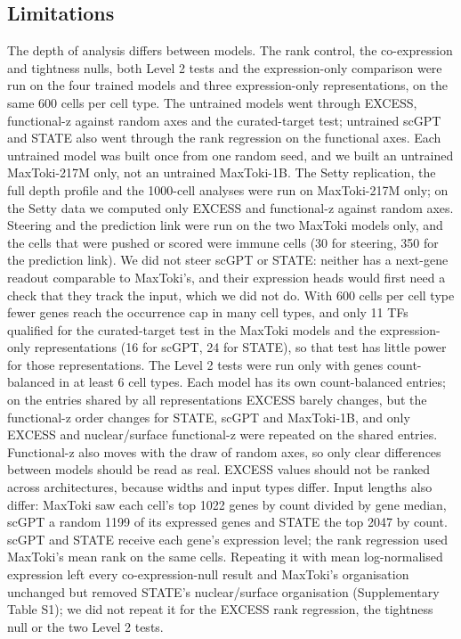 \documentclass[
  11pt,
]{article}
\begin{document}
\subsection{Limitations}\label{limitations}

The depth of analysis differs between models. The rank control, the
co-expression and tightness nulls, both Level 2 tests and the
expression-only comparison were run on the four trained models and three
expression-only representations, on the same 600 cells per cell type.
The untrained models went through EXCESS, functional-z against random
axes and the curated-target test; untrained scGPT and STATE also went
through the rank regression on the functional axes. Each untrained model
was built once from one random seed, and we built an untrained
MaxToki-217M only, not an untrained MaxToki-1B. The Setty replication,
the full depth profile and the 1000-cell analyses were run on
MaxToki-217M only; on the Setty data we computed only EXCESS and
functional-z against random axes. Steering and the prediction link were
run on the two MaxToki models only, and the cells that were pushed or
scored were immune cells (30 for steering, 350 for the prediction link).
We did not steer scGPT or STATE: neither has a next-gene readout
comparable to MaxToki's, and their expression heads would first need a
check that they track the input, which we did not do. With 600 cells per
cell type fewer genes reach the occurrence cap in many cell types, and
only 11 TFs qualified for the curated-target test in the MaxToki models
and the expression-only representations (16 for scGPT, 24 for STATE), so
that test has little power for those representations. The Level 2 tests
were run only with genes count-balanced in at least 6 cell types. Each
model has its own count-balanced entries; on the entries shared by all
representations EXCESS barely changes, but the functional-z order
changes for STATE, scGPT and MaxToki-1B, and only EXCESS and
nuclear/surface functional-z were repeated on the shared entries.
Functional-z also moves with the draw of random axes, so only clear
differences between models should be read as real. EXCESS values should
not be ranked across architectures, because widths and input types
differ. Input lengths also differ: MaxToki saw each cell's top 1022
genes by count divided by gene median, scGPT a random 1199 of its
expressed genes and STATE the top 2047 by count. scGPT and STATE receive
each gene's expression level; the rank regression used MaxToki's mean
rank on the same cells. Repeating it with mean log-normalised expression
left every co-expression-null result and MaxToki's organisation
unchanged but removed STATE's nuclear/surface organisation
(Supplementary Table S1); we did not repeat it for the EXCESS rank
regression, the tightness null or the two Level 2 tests.
\end{document}
